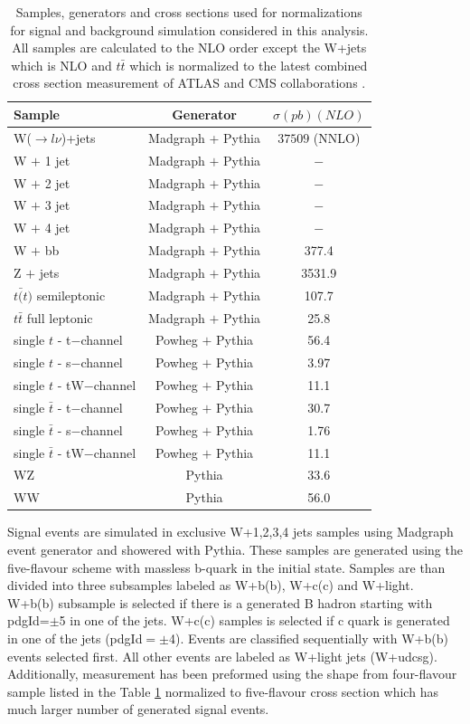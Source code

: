 \begin{table}[h]
  \centering
  \caption{Samples, generators and cross sections used for normalizations for signal and background simulation considered in this analysis. All samples are calculated to the NLO order except the W+jets which is NLO and $t\bar{t}$ which is normalized to the latest combined cross section measurement of ATLAS and CMS collaborations \cite{CMS:2014gta}. }
  \label{tab:samples}
  \begin{tabular}{ l  c c}
      \hline
      \hline
      	Sample & Generator & $\sigma(pb)(NLO)$ \\
      	\hline
    		W($\rightarrow l \nu$)+jets &  Madgraph + Pythia & $37509$ (NNLO) \\
     	W $+$ 1 jet & Madgraph $+$ Pythia & $-$ \\
     	W $+$ 2 jet & Madgraph $+$ Pythia & $-$ \\
     	W $+$ 3 jet & Madgraph $+$ Pythia & $-$ \\
     	W $+$ 4 jet & Madgraph $+$ Pythia & $-$ \\
     	W $+$ bb & Madgraph $+$ Pythia & 377.4 \\
     	\hline
     	Z $+$ jets & Madgraph $+$ Pythia &  3531.9 \\     	
     	$t\bar(t)$ semileptonic & Madgraph $+$ Pythia &  107.7 \\
     	$t\bar{t}$ full leptonic & Madgraph $+$ Pythia &  25.8 \\
     	\hline
     	single $t$ - t$-$channel & Powheg $+$ Pythia &  56.4 \\
     	single $t$ - s$-$channel & Powheg $+$ Pythia &  3.97 \\
		single $t$ - tW$-$channel & Powheg $+$ Pythia &  11.1 \\
		single $\bar{t}$ - t$-$channel & Powheg $+$ Pythia &  30.7 \\
		single $\bar{t}$ - s$-$channel & Powheg $+$ Pythia &  1.76 \\
		single $\bar{t}$ - tW$-$channel & Powheg $+$ Pythia &  11.1 \\
		\hline
		WZ & Pythia & 33.6 \\
		WW & Pythia & 56.0 \\
      \hline
      \hline 
  \end{tabular}
\end{table}

Signal events are simulated in exclusive W+1,2,3,4 jets samples using Madgraph event generator and showered with Pythia. These samples are generated using the five-flavour scheme with massless b-quark in the initial state. Samples are than divided into three subsamples labeled as W+b(b), W+c(c) and W+light. W+b(b) subsample is selected if there is a generated B hadron starting with pdgId=$\pm$5 in one of the jets. W+c(c) samples is selected if c quark is generated in one of the jets (pdgId$=\pm$4). Events are classified sequentially with W+b(b) events selected first. All other events are labeled as W+light jets (W+udcsg). Additionally, measurement has been preformed using the shape from four-flavour sample listed in the Table \ref{tab:samples} normalized to five-flavour cross section which has much larger number of generated signal events.

